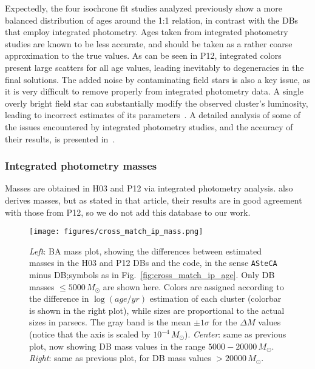 \documentclass[draft]{aa}
\begin{document}
Expectedly, the four isochrone fit studies analyzed previously show a more
balanced distribution of ages around the 1:1 relation, in contrast with the DBs
that employ integrated photometry.
%
Ages taken from integrated photometry studies are known to be less
accurate, and should be taken as a rather coarse approximation to the true
values.
As can be seen in P12, integrated colors present large scatters for
all age values, leading inevitably to degeneracies in the final solutions.
The added noise by contaminating field stars is also a key issue, as it is
very difficult to remove properly from integrated photometry data. A
single overly bright field star can substantially modify the observed
cluster's luminosity, leading to incorrect estimates of its
parameters~\citep{Baumgardt_2013,Piatti_2014_B88}.
A detailed analysis of some of the issues encountered by integrated photometry
studies, and the accuracy of their results, is presented
in~\cite{Anders_2013}.



\subsubsection{Integrated photometry masses}
\label{sssec:integ_photom_masses}
%
%
%
%
Masses are obtained in H03 and P12 via integrated photometry analysis.
\cite{Baumgardt_2013} also derives masses, but as stated in that article, their
results are in good agreement with those from P12, so we do not add this
database to our work.

\begin{figure*}
\texttt{[image: figures/cross\_match\_ip\_mass.png]}
\caption{\emph{Left}: BA mass plot, showing the differences between estimated
masses in the H03 and P12 DBs and the code, in the sense \texttt{ASteCA} minus
DB;\@ symbols as in Fig.~\ref{fig:cross_match_ip_age}.
Only DB masses ${\le}5000\,M_{\odot}$ are shown here.
Colors are assigned according to the difference in $\log(age/yr)$ estimation of
each cluster (colorbar is shown in the right plot), while sizes are proportional to
the actual sizes in parsecs. The gray band is the mean $\pm 1\sigma$ for the
$\Delta M$ values (notice that the axis is scaled by $10^{-4}\,M_{\odot}$).
\emph{Center}: same as previous plot, now showing DB mass values in the range
$5000-20000\,M_{\odot}$.
\emph{Right}: same as previous plot, for DB mass values ${>}20000\,M_{\odot}$.
}
\label{fig:cross_match_ip_mass}
\end{figure*}
\end{document}
